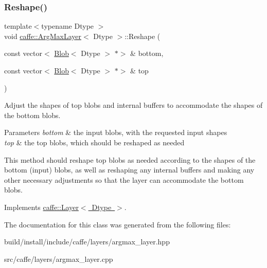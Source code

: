 \subsubsection{\texorpdfstring{Reshape()}{Reshape()}\hspace{0.1cm}{\footnotesize\ttfamily [2/2]}}
{\footnotesize\ttfamily template$<$typename Dtype $>$ \\
void \mbox{\hyperlink{classcaffe_1_1_arg_max_layer}{caffe\+::\+Arg\+Max\+Layer}}$<$ Dtype $>$\+::Reshape (\begin{DoxyParamCaption}\item[{const vector$<$ \mbox{\hyperlink{classcaffe_1_1_blob}{Blob}}$<$ Dtype $>$ $\ast$$>$ \&}]{bottom,  }\item[{const vector$<$ \mbox{\hyperlink{classcaffe_1_1_blob}{Blob}}$<$ Dtype $>$ $\ast$$>$ \&}]{top }\end{DoxyParamCaption})\hspace{0.3cm}{\ttfamily [virtual]}}



Adjust the shapes of top blobs and internal buffers to accommodate the shapes of the bottom blobs. 


\begin{DoxyParams}{Parameters}
{\em bottom} & the input blobs, with the requested input shapes \\
\hline
{\em top} & the top blobs, which should be reshaped as needed\\
\hline
\end{DoxyParams}
This method should reshape top blobs as needed according to the shapes of the bottom (input) blobs, as well as reshaping any internal buffers and making any other necessary adjustments so that the layer can accommodate the bottom blobs. 

Implements \mbox{\hyperlink{classcaffe_1_1_layer_a7fe981e8af8d93d587acf2a952be563d}{caffe\+::\+Layer$<$ Dtype $>$}}.



The documentation for this class was generated from the following files\+:\begin{DoxyCompactItemize}
\item 
build/install/include/caffe/layers/argmax\+\_\+layer.\+hpp\item 
src/caffe/layers/argmax\+\_\+layer.\+cpp\end{DoxyCompactItemize}
